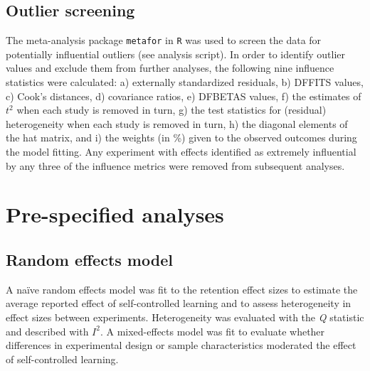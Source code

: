 \documentclass[man,floatsintext,hidelinks]{apa7}
\begin{document}
\subsection{Outlier screening}
The meta-analysis package \texttt{metafor} \parencite{Viechtbauer2010-ss} in \texttt{R} was used to screen the data for potentially influential outliers (see analysis script). In order to identify outlier values and exclude them from further analyses, the following nine influence statistics were calculated: a) externally standardized residuals, b) DFFITS values, c) Cook's distances, d) covariance ratios, e) DFBETAS values, f) the estimates of $t^2$ when each study is removed in turn, g) the test statistics for (residual) heterogeneity when each study is removed in turn, h) the diagonal elements of the hat matrix, and i) the weights (in \%) given to the observed outcomes during the model fitting. Any experiment with effects identified as extremely influential by any three of the influence metrics were removed from subsequent analyses. 

\section{Pre-specified analyses}
\subsection{Random effects model}
A naïve random effects model was fit to the retention effect sizes to estimate the average reported effect of self-controlled learning and to assess heterogeneity in effect sizes between experiments. Heterogeneity was evaluated with the \emph{Q} statistic and described with $I^2$. A mixed-effects model was fit to evaluate whether differences in experimental design or sample characteristics moderated the effect of self-controlled learning.
\end{document}
